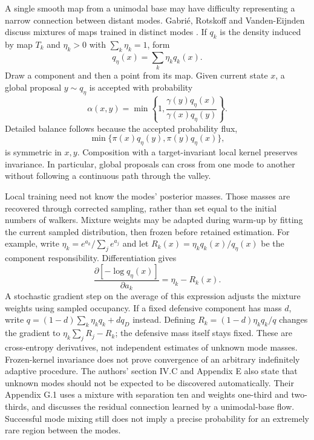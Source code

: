 A single smooth map from a unimodal base may have difficulty representing a
narrow connection between distant modes. Gabri\'e, Rotskoff and
Vanden-Eijnden discuss mixtures of maps trained in distinct modes
\citep[section IV.E]{gabrie2022adaptiveflows}. If $q_k$ is the density induced
by map $T_k$ and $\eta_k>0$ with $\sum_k\eta_k=1$, form
\begin{equation}
 q_\eta(x)=\sum_k\eta_kq_k(x).
 \label{eq:rare-local-map-mixture}
\end{equation}
Draw a component and then a point from its map. Given current state $x$, a
global proposal $y\sim q_\eta$ is accepted with probability
\begin{equation}
 \alpha(x,y)=\min\left\{1,
 \frac{\gamma(y)q_\eta(x)}{\gamma(x)q_\eta(y)}\right\}.
 \label{eq:rare-mixture-mh}
\end{equation}
Detailed balance follows because the accepted probability flux,
\[
 \min\{\pi(x)q_\eta(y),\pi(y)q_\eta(x)\},
\]
is symmetric in $x,y$.
Composition with a target-invariant local kernel preserves invariance. In
particular, global proposals can cross from one mode to another without
following a continuous path through the valley.

Local training need not know the modes' posterior masses. Those masses are
recovered through corrected sampling, rather than set equal to the initial
numbers of walkers. Mixture weights may be adapted during warm-up by fitting
the current sampled distribution, then frozen before retained estimation.
For example, write $\eta_k=e^{a_k}/\sum_j e^{a_j}$ and let
$R_k(x)=\eta_kq_k(x)/q_\eta(x)$ be the component responsibility.
Differentiation gives
\begin{equation}
 \frac{\partial[-\log q_\eta(x)]}{\partial a_k}
 =\eta_k-R_k(x).
 \label{eq:rare-mixture-logit-gradient}
\end{equation}
A stochastic gradient step on the average of this expression adjusts the
mixture weights using sampled occupancy. If a fixed defensive component
has mass $d$, write $q=(1-d)\sum_k\eta_kq_k+dq_D$ instead. Defining
$R_k=(1-d)\eta_kq_k/q$ changes the gradient to
$\eta_k\sum_jR_j-R_k$; the defensive mass itself stays fixed. These are
cross-entropy derivatives, not independent estimates of unknown mode masses.
Frozen-kernel invariance does not prove convergence of an arbitrary indefinitely
adaptive procedure. The authors' section IV.C and Appendix E also state that
unknown modes should not be expected to be discovered automatically. Their
Appendix G.1 uses a mixture with separation ten and weights one-third and
two-thirds, and discusses the residual connection learned by a unimodal-base
flow. Successful mode mixing still does not imply a precise probability for
an extremely rare region between the modes.

